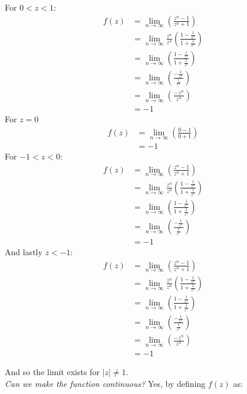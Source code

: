\begin{enumerate}
	For $0 < z < 1$:
	\begin{align*}
		f(z) &= \lim_{n \to \infty} \left( \frac{z^n - 1}{z^n + 1} \right) \\
		&= \lim_{n \to \infty} \frac{z^n}{z^n} \left( \frac{1 - \frac{1}{z^n}}{1 + \frac{1}{z^n}} \right) \\
		&= \lim_{n \to \infty} \left( \frac{1 - \frac{1}{z^n}}{1 + \frac{1}{z^n}} \right) \\
		&= \lim_{n \to \infty} \left( \frac{- \frac{1}{z^n}}{\frac{1}{z^n}} \right) \\
		&= \lim_{n \to \infty} \left( \frac{- z^n}{{z^n}} \right) \\
		&= -1
	\end{align*}
	For $z = 0$
	\begin{align*}
		f(z) &= \lim_{n \to \infty} \left( \frac{0 - 1}{0 + 1} \right) \\
		&= -1
	\end{align*}
	For $ -1 < z < 0$:
	\begin{align*}
		f(z) &= \lim_{n \to \infty} \left( \frac{z^n - 1}{z^n + 1} \right) \\
		&= \lim_{n \to \infty} \frac{z^n}{z^n} \left( \frac{1 - \frac{1}{z^n}}{1 + \frac{1}{z^n}} \right) \\
		&= \lim_{n \to \infty} \left( \frac{1 - \frac{1}{z^n}}{1 + \frac{1}{z^n}} \right) \\
		&= \lim_{n \to \infty} \left( \frac{- \frac{1}{z^n}}{\frac{1}{z^n}} \right) \\
		&= -1
	\end{align*}
	And lastly $z < -1$:
	\begin{align*}
		f(z) &= \lim_{n \to \infty} \left( \frac{z^n - 1}{z^n + 1} \right) \\
		&= \lim_{n \to \infty} \frac{z^n}{z^n} \left( \frac{1 - \frac{1}{z^n}}{1 + \frac{1}{z^n}} \right) \\
		&= \lim_{n \to \infty} \left( \frac{1 - \frac{1}{z^n}}{1 + \frac{1}{z^n}} \right) \\
		&= \lim_{n \to \infty} \left( \frac{- \frac{1}{z^n}}{\frac{1}{z^n}} \right) \\
		&= \lim_{n \to \infty} \left( \frac{- z^n}{{z^n}} \right) \\
		&= -1
	\end{align*}

	And so the limit exists for $|z| \not = 1.$ \\
	
	\emph{Can we make the function continuous?} Yes, by defining $f(z)$ as:
	

\end{enumerate}
